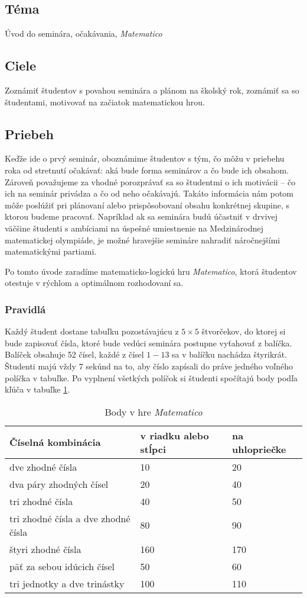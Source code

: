 
\subsection*{Téma}
Úvod do seminára, očakávania, \textit{Matematico}

\subsection*{Ciele}
Zoznámiť študentov s povahou seminára a plánom na školský rok, zoznámiť sa so študentami, motivovať na začiatok matematickou hrou.

\subsection*{Priebeh}

Keďže ide o prvý seminár, oboznámime študentov s tým, čo môžu v priebehu roka od stretnutí očakávať: aká bude forma seminárov a čo bude ich obsahom. Zároveň považujeme za vhodné porozprávať sa so študentmi o ich motivácii -- čo ich na seminár privádza a čo od neho očakávajú. Takáto informácia nám potom môže poslúžiť pri plánovaní alebo prispôsobovaní obsahu konkrétnej skupine, s ktorou budeme pracovať. Napríklad ak sa seminára budú účastniť v drvivej väčšine študenti s ambíciami na úspešné umiestnenie na Medzinárodnej matematickej olympiáde, je možné hravejšie semináre nahradiť náročnejšími matematickými partiami.

Po tomto úvode zaradíme matematicko-logickú hru \textit{Matematico}, ktorá študentov otestuje v rýchlom a optimálnom rozhodovaní sa.

\subsubsection*{Pravidlá}

Každý študent dostane tabuľku pozostávajúcu z $5\times5$ štvorčekov, do ktorej si bude zapisovať čísla, ktoré bude vedúci seminára postupne vyťahovať z balíčka. Balíček obsahuje 52 čísel, každé z čísel $1-13$ sa v balíčku nachádza štyrikrát. Študenti majú vždy 7 sekúnd na to, aby číslo zapísali do práve jedného voľného políčka v tabuľke. Po vyplnení všetkých políčok si študenti spočítajú body podľa kľúča v tabuľke \ref{fujky}.
\begin{table}
\begin{tabular}{l l l}
Číselná kombinácia & v riadku alebo stĺpci & na uhlopriečke \\
\hline
dve zhodné čísla & 10 & 20\\
dva páry zhodných čísel & 20 & 40\\
tri zhodné čísla & 40 & 50 \\
tri zhodné čísla a dve zhodné čísla & 80 & 90 \\
štyri zhodné čísla & 160 & 170 \\
päť za sebou idúcich čísel & 50 & 60 \\
tri jednotky a dve trinástky & 100 & 110 \\
\end{tabular}
\caption{Body v hre \textit{Matematico}} \label{fujky}
\end{table}

